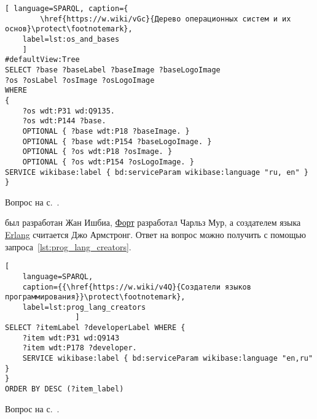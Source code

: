 \begin{task}
\label{answer:os_and_bases}

\begin{lstlisting}[ language=SPARQL, caption={
		\href{https://w.wiki/vGc}{Дерево операционных систем и их основ}\protect\footnotemark},
	label=lst:os_and_bases
	]
#defaultView:Tree
SELECT ?base ?baseLabel ?baseImage ?baseLogoImage
?os ?osLabel ?osImage ?osLogoImage
WHERE
{
	?os wdt:P31 wd:Q9135.
	?os wdt:P144 ?base.
	OPTIONAL { ?base wdt:P18 ?baseImage. }
	OPTIONAL { ?base wdt:P154 ?baseLogoImage. }
	OPTIONAL { ?os wdt:P18 ?osImage. }
	OPTIONAL { ?os wdt:P154 ?osLogoImage. }
SERVICE wikibase:label { bd:serviceParam wikibase:language "ru, en" }
}
\end{lstlisting}

\small{\AnswerBackref Вопрос на с.~\pageref{tasks:operating_system_tasks}.}
\end{task}




\hfil{}\hfil%

\begin{task}
\label{answer:prog_lang_1}
    был разработан Жан Ишбиа, 
    \href{https://ru.wikipedia.org/wiki/Форт_(язык_программирования)}{Форт} разработал Чарльз Мур, 
    а создателем языка \href{https://ru.wikipedia.org/wiki/Erlang}{Erlang} считается Джо Армстронг. 
    Ответ на вопрос можно получить с помощью запроса~\ref{lst:prog_lang_creators}. 
\begin{lstlisting}[
    language=SPARQL, 
    caption={{\href{https://w.wiki/v4Q}{Создатели языков программирования}}\protect\footnotemark}, 
    label=lst:prog_lang_creators
                ]
SELECT ?itemLabel ?developerLabel WHERE {
    ?item wdt:P31 wd:Q9143
    ?item wdt:P178 ?developer.
    SERVICE wikibase:label { bd:serviceParam wikibase:language "en,ru" }
}
ORDER BY DESC (?item_label)
\end{lstlisting}

\small{\AnswerBackref Вопрос на с.~\pageref{question:prog_lang_1}.}
\end{task}



